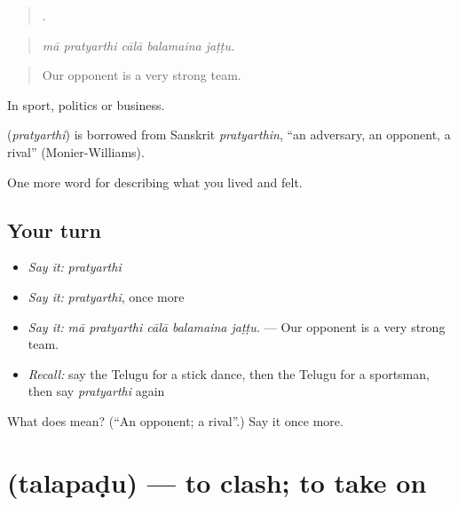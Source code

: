 \begin{quote}
    .
\end{quote}

\begin{quote}
\emph{mā pratyarthi cālā balamaina jaṭṭu.}
\end{quote}

\begin{quote}
Our opponent is a very strong team.
\end{quote}

In sport, politics or business.

\begin{cousinweb}
\textbf{} (\emph{pratyarthi}) is borrowed from Sanskrit \emph{pratyarthin}, \textquotedblleft{}an adversary, an opponent, a rival\textquotedblright{} (Monier-Williams).
\end{cousinweb}

\begin{grammarlens}[title={What you've built}]
One more word for describing what you lived and felt.
\end{grammarlens}

\subsection*{Your turn}
\begin{itemize}
\raggedright
  \item \emph{Say it:} \emph{pratyarthi}
  \item \emph{Say it:} \emph{pratyarthi}, once more
  \item \emph{Say it:} \emph{mā pratyarthi cālā balamaina jaṭṭu.} — Our opponent is a very strong team.
  \item \emph{Recall:} say the Telugu for a stick dance, then the Telugu for a sportsman, then say \emph{pratyarthi} again
\end{itemize}

\begin{tcolorbox}[breakable,colback=teal!4,colframe=teal!35!black,title={Before you move on}]
What does  mean? (\textquotedblleft{}An opponent; a rival\textquotedblright{}.) Say it once more.
\end{tcolorbox}
\section[\texorpdfstring{\te{తలపడు} (talapaḍu)}{తలపడు (talapaḍu)}]{ (talapaḍu) — to clash; to take on}

